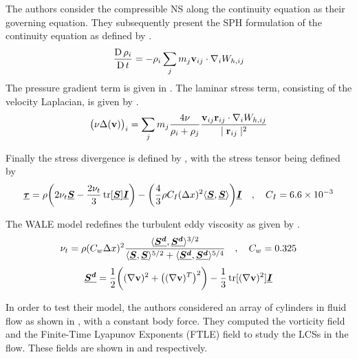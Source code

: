 The authors consider the compressible NS along the continuity equation as their governing equation. They subsequently present the SPH formulation of the continuity equation as defined by .
\begin{equation}
    \frac{\operatorname{D} \rho_i}{\operatorname{D} t} = - \rho_i \sum_j m_j \mathbf{v}_{ij} \cdot \nabla_{i} W_{h, ij}
    \label{eq:Canelas2016-continuity-sph}
\end{equation}
The pressure gradient term is given in . The laminar stress term, consisting of the velocity Laplacian, is given by . 
\begin{equation}
    \big(\nu \Delta(\mathbf{v}) \big)_i = \sum_j m_j \frac{4 \nu}{\rho_i + \rho_j}\frac{\mathbf{v}_{ij} \mathbf{r}_{ij} \cdot \nabla_{i} W_{h, ij}}{\mid \mathbf{r}_{ij} \mid^{2}}
    \label{eq:Canelas2016-vel-laplacian-sph}
\end{equation}

Finally the stress divergence is defined by , with the stress tensor being defined by 
\begin{equation}
    \underline{\bm{\tau}} = \rho \bigg( 2\nu_t \underline{\bm{S}} - \frac{2 \nu_t}{3}\operatorname{tr}[\underline{\bm{S}}]\underline{\bm{I}} \bigg) - \bigg( \frac{4}{3} \rho C_I (\Delta x)^2 \langle \underline{\bm{S}}, \underline{\bm{S}} \rangle \bigg) \underline{\bm{I}} \quad , \quad C_I = 6.6 \times {10}^{-3}
    \label{eq:Canelas2016-tau}
\end{equation}

The WALE model redefines the turbulent eddy viscosity as given by .
\begin{equation}
    \nu_t = \rho (C_w \Delta x)^2 \frac{\langle \underline{\bm{S^d}}, \underline{\bm{S^d}} \rangle^{3/2}}{\langle \underline{\bm{S}}, \underline{\bm{S}} \rangle^{5/2} + \langle \underline{\bm{S^d}}, \underline{\bm{S^d}} \rangle^{5/4}} \quad , \quad C_w=0.325
    \label{eq:Canelas2016-turbulent-eddy-visc}
\end{equation}
\begin{equation}
    \underline{\bm{S^d}} = \frac{1}{2} \bigg( (\nabla \mathbf{v})^2 + \big((\nabla \mathbf{v})^T\big)^2 \bigg) - \frac{1}{3} \operatorname{tr}[(\nabla \mathbf{v})^2] \underline{\bm{I}}
\end{equation}

In order to test their model, the authors considered an array of cylinders in fluid flow as shown in , with a constant body force. They computed the vorticity field and the Finite-Time Lyapunov Exponents (FTLE) field to study the LCSs in the flow. These fields are shown in  and  respectively.

